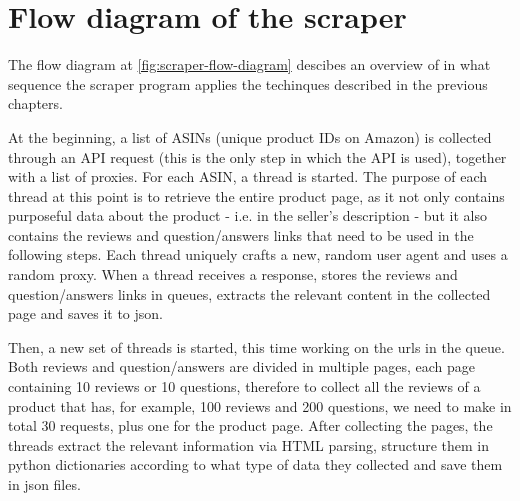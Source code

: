 \documentclass[LaM,oneside,binding=0.6cm]{sapthesis}
\begin{document}
\section{Flow diagram of the scraper}

The flow diagram at \ref{fig:scraper-flow-diagram} descibes an overview of in what sequence the scraper program applies the techinques described in the previous chapters.

At the beginning, a list of ASINs (unique product IDs on Amazon) is collected through an API request (this is the only step in which the API is used), together with a list of proxies. For each ASIN, a thread is started. The purpose of each thread at this point is to retrieve the entire product page, as it not only contains purposeful data about the product - i.e. in the seller's description - but it also contains the reviews and question/answers links that need to be used in the following steps. Each thread uniquely crafts a new, random user agent and uses a random proxy. When a thread receives a response, stores the reviews and question/answers links in queues, extracts the relevant content in the collected page and saves it to json. 

Then, a new set of threads is started, this time working on the urls in the queue. Both reviews and question/answers are divided in multiple pages, each page containing 10 reviews or 10 questions, therefore to collect all the reviews of a product that has, for example, 100 reviews and 200 questions, we need to make in total 30 requests, plus one for the product page. After collecting the pages, the threads extract the relevant information via HTML parsing, structure them in python dictionaries according to what type of data they collected and save them in json files.  
\end{document}
